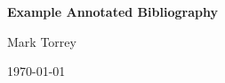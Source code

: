\documentclass[12pt]{article}
\begin{document}
\begin{center}
   {\Large\textbf{Example Annotated Bibliography}}
\medskip

   {\large  Mark Torrey
\medskip

\medskip

           \today
   }
\end{center}
\nocite{*} %



\end{document}
